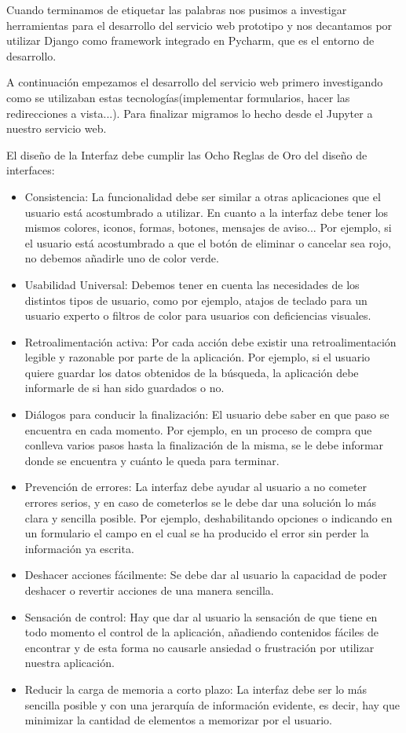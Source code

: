 Cuando terminamos de etiquetar las palabras nos pusimos a investigar herramientas para el desarrollo del servicio web prototipo y nos decantamos por utilizar Django como framework integrado en Pycharm, que es el entorno de desarrollo.

A continuación empezamos el desarrollo del servicio web primero investigando como se utilizaban estas tecnologías(implementar formularios, hacer las redirecciones a vista...). Para finalizar migramos lo hecho desde el Jupyter a nuestro servicio web.



El diseño de la Interfaz debe cumplir las Ocho Reglas de Oro del diseño de interfaces:
\begin{itemize} 
	\item Consistencia: La funcionalidad debe ser similar a otras aplicaciones que el usuario está acostumbrado a utilizar. En cuanto a la interfaz debe tener los mismos colores, iconos, formas, botones, mensajes de aviso... Por ejemplo, si el usuario está acostumbrado a que el botón de eliminar o cancelar sea rojo, no debemos añadirle uno de color verde.
	\item Usabilidad Universal: Debemos tener en cuenta las necesidades de los distintos tipos de usuario, como por ejemplo, atajos de teclado para un usuario experto o filtros de color para usuarios con deficiencias visuales.
	\item Retroalimentación activa: Por cada acción debe existir una retroalimentación legible y razonable por parte de la aplicación. Por ejemplo, si el usuario quiere guardar los datos obtenidos de la búsqueda, la aplicación debe informarle de si han sido guardados o no.
	\item Diálogos para conducir la finalización: El usuario debe saber en que paso se encuentra en cada momento. Por ejemplo, en un proceso de compra que conlleva varios pasos hasta la finalización de la misma, se le debe informar donde se encuentra y cuánto le queda para terminar.
	\item Prevención de errores: La interfaz debe ayudar al usuario a no cometer errores serios, y en caso de cometerlos se le debe dar una solución lo más clara y sencilla posible. Por ejemplo, deshabilitando opciones o indicando en un formulario el campo en el cual se ha producido el error sin perder la información ya escrita.
	\item Deshacer acciones fácilmente: Se debe dar al usuario la capacidad de poder deshacer o revertir acciones de una manera sencilla. 
	\item Sensación de control: Hay que dar al usuario la sensación de que tiene en todo momento el control de la aplicación, añadiendo contenidos fáciles de encontrar y de esta forma no causarle ansiedad o frustración por utilizar nuestra aplicación.
	\item Reducir la carga de memoria a corto plazo: La interfaz debe ser lo más sencilla posible y con una jerarquía de información evidente, es decir, hay que minimizar la cantidad de elementos a memorizar por el usuario.
\end{itemize}
